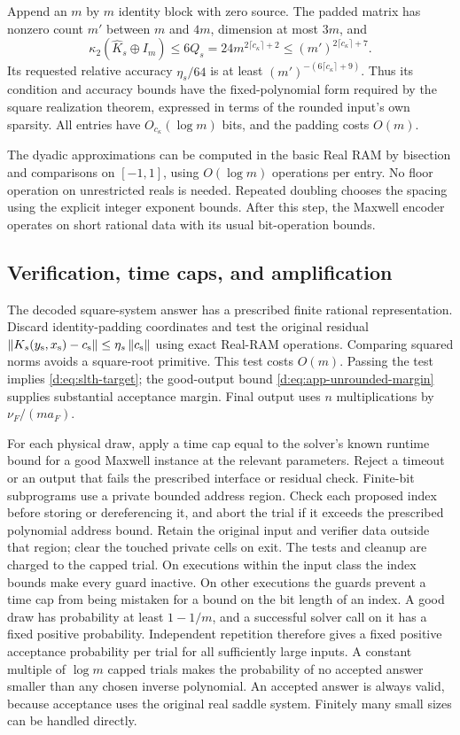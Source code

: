 Append an $m$ by $m$ identity block with zero source. The padded
matrix has nonzero count $m'$ between $m$ and $4m$, dimension at most
$3m$, and
\begin{equation}
 \kappa_2(\widehat K_s\oplus I_m)
 \le6Q_s=24m^{2\lceil c_\kappa\rceil+2}\le(m')^{2\lceil c_\kappa\rceil+7}.
\end{equation}
Its requested relative accuracy $\eta_s/64$ is at least
$(m')^{-(6\lceil c_\kappa\rceil+9)}$. Thus its condition and accuracy bounds have the
fixed-polynomial form required by the square realization theorem,
expressed in terms of the rounded input's own sparsity. All entries
have $O_{c_\kappa}(\log m)$ bits, and the padding costs $O(m)$.

The dyadic approximations can be computed in the basic Real RAM by
bisection and comparisons on $[-1,1]$, using $O(\log m)$ operations
per entry. No floor operation on unrestricted reals is needed.
Repeated doubling chooses the spacing using the explicit integer
exponent bounds. After this step, the Maxwell encoder operates on
short rational data with its usual bit-operation bounds.

\subsection{Verification, time caps, and amplification}

The decoded square-system answer has a prescribed finite rational
representation. Discard identity-padding coordinates and test the
original residual $\left\lVert K_s(y_{\rm s},x_{\rm s})-c_{\rm s}\right\rVert\le\eta_s\left\lVert c_{\rm s}\right\rVert$ using exact
Real-RAM operations. Comparing squared norms avoids a square-root
primitive. This test costs $O(m)$. Passing the test implies
\eqref{d:eq:slth-target}; the good-output bound
\eqref{d:eq:app-unrounded-margin} supplies substantial acceptance margin.
Final output uses $n$ multiplications by $\nu_F/(ma_F)$.

For each physical draw, apply a time cap equal to the solver's known
runtime bound for a good Maxwell instance at the relevant parameters. Reject
a timeout or an output that fails the prescribed interface or residual
check. Finite-bit subprograms use a private bounded address region.
Check each proposed index before storing or dereferencing it, and abort
the trial if it exceeds the prescribed polynomial address bound.
Retain the original input and verifier data outside that region; clear
the touched private cells on exit. The tests and cleanup are charged
to the capped trial. On executions within the input class the index
bounds make every guard inactive. On other executions the guards prevent a time cap from
being mistaken for a bound on the bit length of an index.
A good draw has probability at least $1-1/m$, and a successful
solver call on it has a fixed positive probability. Independent
repetition therefore gives a fixed positive acceptance probability
per trial for all sufficiently large inputs. A constant multiple of
$\log m$ capped trials makes the probability of no accepted answer
smaller than any chosen inverse polynomial. An accepted answer is
always valid, because acceptance uses the original real saddle system.
Finitely many small sizes can be handled directly.

